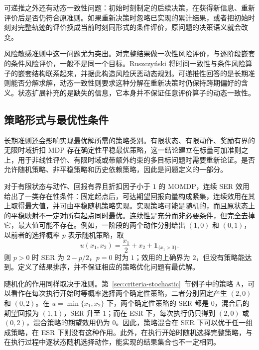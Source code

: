 可递推之外还有动态一致性问题：初始时刻制定的后续决策，在获得新信息、重新评价后是否仍符合原准则。如果重新决策时忽略已实现的累计结果，或者把初始时刻对完整轨迹的评价换成当前时刻同形式的条件评价，原问题的决策语义就会改变。

风险敏感准则中这一问题尤为突出。对完整结果做一次性风险评价，与逐阶段嵌套的条件风险评价，一般不是同一个目标。Ruszczyński 将时间一致性与条件风险算子的嵌套结构联系起来，并据此构造风险厌恶动态规划\cite{ruszczynski2010}。可递推性回答的是长期准则能否分解求解，动态一致性则要求这种分解在重新决策时仍保持跨期偏好的含义。状态扩展补充的是缺失的信息，它本身并不保证任意评价算子的动态一致性。

\subsection{策略形式与最优性条件}\label{sec:structure-policy}

长期准则还会影响实现最优解所需的策略类别。有限状态、有限动作、奖励有界的无限时域折扣 MDP 存在确定性平稳最优策略，这一结论建立在标量可加准则之上，用于非线性评价、有限时域或带额外约束的多目标问题时需要重新论证\cite{roijers2013}。是否允许随机策略、非平稳策略和历史依赖策略，因此是问题定义的一部分\cite{hayes2022}。

对于有限状态与动作、回报有界且折扣因子小于 $1$ 的 MOMDP，连续 SER 效用给出了一类存在性条件：固定起点后，可达期望回报向量构成紧集，连续效用在其上取得最大值，并可由平稳随机策略实现\cite{rodriguezsoto2026utility}。实现策略可能是随机的，而且原状态上的平稳映射不一定对所有起点同时最优。连续性是充分而非必要条件，但完全去掉它，最大值可能不存在。例如，一阶段的两个动作分别给出 $(1,0)$ 和 $(0,1)$，以前者的选择概率 $p$ 表示随机策略，取
\begin{equation}
u(x_1,x_2)=\frac{x_1}{2}+x_2+\mathbf 1_{\{x_1>0\}}.
\end{equation}
则 $p>0$ 时 SER 为 $2-p/2$，$p=0$ 时为 $1$；效用的上确界为 $2$，但没有策略能达到\cite{rodriguezsoto2026utility}。定义了结果排序，并不保证相应的策略优化问题有最优解。

随机化的作用同样取决于准则。第~\ref{sec:criteria-stochastic}~节例子中的策略 A，可以看作在每次执行开始时等概率选择两个确定性策略，二者分别固定产生 $(2,0)$ 和 $(0,2)$。在 $u=\min\{x_1,x_2\}$ 下，两个确定性策略的 SER 都是 $0$，混合后的期望回报为 $(1,1)$，SER 升至 $1$；而在 ESR 下，每次执行仍只得到 $(2,0)$ 或 $(0,2)$，混合策略的期望效用仍为 $0$。因此，策略混合在 SER 下可以优于任一组成策略，在 ESR 下则没有这种作用。此外，在执行开始时随机选择完整策略，与在执行过程中逐状态随机选择动作，能实现的结果集合也不一定相同\cite{roijers2013}。

